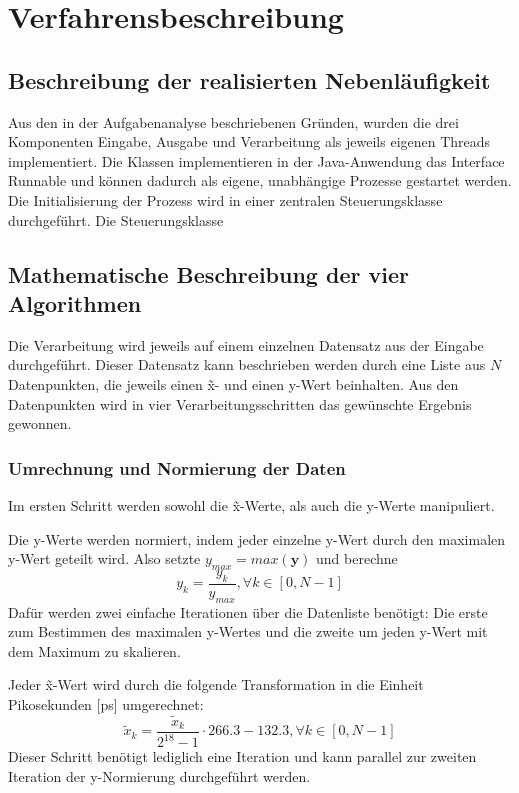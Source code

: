 \chapter{Verfahrensbeschreibung}\label{ch:verfahrensbeschreibung}

\section{Beschreibung der realisierten Nebenläufigkeit}\label{sec:nebenl}
Aus den in der Aufgabenanalyse beschriebenen Gründen, wurden die drei Komponenten Eingabe, Ausgabe und Verarbeitung als jeweils eigenen Threads implementiert.
Die Klassen implementieren in der Java-Anwendung das Interface Runnable und können dadurch als eigene, unabhängige Prozesse gestartet werden.
Die Initialisierung der Prozess wird in einer zentralen Steuerungsklasse durchgeführt.
Die Steuerungsklasse



\section{Mathematische Beschreibung der vier Algorithmen}\label{sec:mat-beschreibung}
Die Verarbeitung wird jeweils auf einem einzelnen Datensatz aus der Eingabe durchgeführt.
Dieser Datensatz kann beschrieben werden durch eine Liste aus $N$ Datenpunkten, die jeweils einen \~x- und einen y-Wert beinhalten.
Aus den Datenpunkten wird in vier Verarbeitungsschritten das gewünschte Ergebnis gewonnen.

\subsection{Umrechnung und Normierung der Daten}\label{subsec:umrechnung-und-normierung}
Im ersten Schritt werden sowohl die \~x-Werte, als auch die y-Werte manipuliert.

Die y-Werte werden normiert, indem jeder einzelne y-Wert durch den maximalen y-Wert geteilt wird.
Also setzte $y_{max} = max(\bm{y})$ und berechne
\[
    y_k = \frac{y_k}{y_{max}}, \forall k \in [0, N - 1]
\]
Dafür werden zwei einfache Iterationen über die Datenliste benötigt:
Die erste zum Bestimmen des maximalen y-Wertes und die zweite um jeden y-Wert mit dem Maximum zu skalieren.

Jeder \~x-Wert wird durch die folgende Transformation in die Einheit Pikosekunden [ps] umgerechnet:
\[
    \tilde{x}_k = \frac{\tilde{x}_k}{2^{18} - 1} \cdot 266.3 - 132.3, \forall k \in [0, N - 1]
\]
Dieser Schritt benötigt lediglich eine Iteration und kann parallel zur zweiten Iteration der y-Normierung durchgeführt werden.

